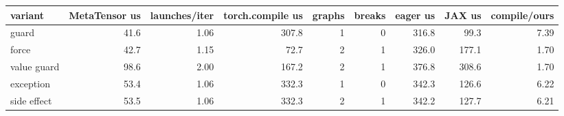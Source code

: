 \begin{tabular}{lrrrrrrrr}
\toprule
variant & MetaTensor us & launches/iter & torch.compile us & graphs & breaks & eager us & JAX us & compile/ours \\
\midrule
guard & 41.6 & 1.06 & 307.8 & 1 & 0 & 316.8 & 99.3 & 7.39 \\
force & 42.7 & 1.15 & 72.7 & 2 & 1 & 326.0 & 177.1 & 1.70 \\
value guard & 98.6 & 2.00 & 167.2 & 2 & 1 & 376.8 & 308.6 & 1.70 \\
exception & 53.4 & 1.06 & 332.3 & 1 & 0 & 342.3 & 126.6 & 6.22 \\
side effect & 53.5 & 1.06 & 332.3 & 2 & 1 & 342.2 & 127.7 & 6.21 \\
\bottomrule
\end{tabular}
